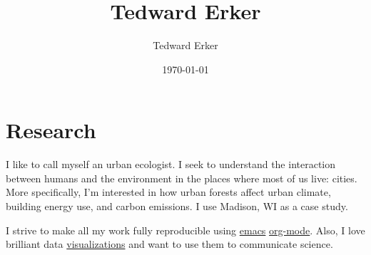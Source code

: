 \documentclass{article}
\author{Tedward Erker}
\date{\today}
\title{Tedward Erker}
\begin{document}
\maketitle
\tableofcontents


\section*{Research}
\label{sec:org5f7b566}
I like to call myself an urban ecologist.  I seek to understand the interaction between humans and the
environment in the places where most of us live: cities.  More
specifically, I'm interested in how urban forests affect urban
climate, building energy use, and carbon emissions.  I use Madison, WI
as a case study.

I strive to make all my work fully reproducible using \href{https://www.gnu.org/software/emacs/tour/}{emacs}
\href{http://orgmode.org/}{org-mode}.  Also, I love brilliant data \href{https://d3js.org/}{visualizations} and want
to use them to communicate science.
\end{document}

